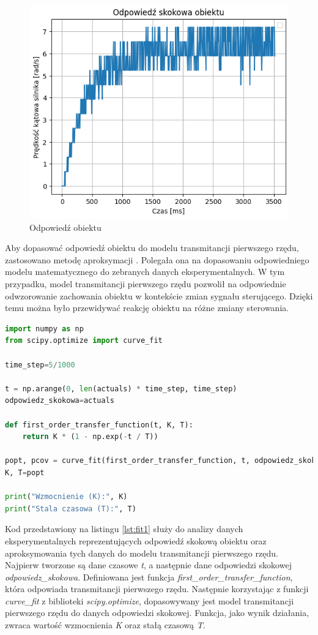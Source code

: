 \documentclass[12pt,twoside]{article}
\begin{document}
\begin{figure}[ht]%
 \centering%
 \includegraphics[width=12cm]{figures/PID/noreg.png}%
 \caption{Odpowiedź obiektu}%
 \label{Fig:noreg}%
\end{figure}

Aby dopasować odpowiedź obiektu do modelu transmitancji pierwszego rzędu, zastosowano metodę aproksymacji \cite{automatyka}. Polegała ona na dopasowaniu odpowiedniego modelu matematycznego do zebranych danych eksperymentalnych. W tym przypadku, model transmitancji pierwszego rzędu pozwolił na odpowiednie odwzorowanie zachowania obiektu w kontekście zmian sygnału sterującego. Dzięki temu można było przewidywać reakcję obiektu na różne zmiany sterowania.

\begin{lstlisting}[language=Python, caption=Kod aproksymujący odpowiedź, label={lst:fit1}]
import numpy as np
from scipy.optimize import curve_fit

time_step=5/1000
  
t = np.arange(0, len(actuals) * time_step, time_step)
odpowiedz_skokowa=actuals 

def first_order_transfer_function(t, K, T):
    return K * (1 - np.exp(-t / T))

popt, pcov = curve_fit(first_order_transfer_function, t, odpowiedz_skokowa)
K, T=popt

print("Wzmocnienie (K):", K)
print("Stala czasowa (T):", T)
\end{lstlisting}

Kod przedstawiony na listingu \ref{lst:fit1} służy do analizy danych eksperymentalnych reprezentujących odpowiedź skokową obiektu oraz aproksymowania tych danych do modelu transmitancji pierwszego rzędu. Najpierw tworzone są dane czasowe \textit{t}, a następnie dane odpowiedzi skokowej \textit{odpowiedz\_skokowa}. Definiowana jest funkcja \textit{first\_order\_transfer\_function}, która odpowiada transmitancji pierwszego rzędu. Następnie korzystając z funkcji \textit{curve\_fit} z biblioteki \textit{scipy.optimize}, dopasowywany jest model transmitancji pierwszego rzędu do danych odpowiedzi skokowej. Funkcja, jako wynik działania, zwraca wartość wzmocnienia \textit{K} oraz stałą czasową \textit{T}.
\end{document}
